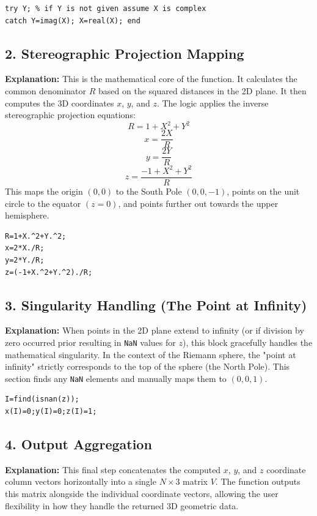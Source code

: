 \begin{lstlisting}[style=matlabstyle]
try Y; % if Y is not given assume X is complex
catch Y=imag(X); X=real(X); end
\end{lstlisting}

\subsection{2. Stereographic Projection Mapping}
\textbf{Explanation:} 
This is the mathematical core of the function. It calculates the common denominator $R$ based on the squared distances in the 2D plane. It then computes the 3D coordinates $x$, $y$, and $z$. The logic applies the inverse stereographic projection equations:
$$R=1+X^2+Y^2$$
$$x=\frac{2X}{R}$$
$$y=\frac{2Y}{R}$$
$$z=\frac{-1+X^2+Y^2}{R}$$
This maps the origin $(0,0)$ to the South Pole $(0,0,-1)$, points on the unit circle to the equator $(z=0)$, and points further out towards the upper hemisphere.

\begin{lstlisting}[style=matlabstyle]
R=1+X.^2+Y.^2;
x=2*X./R;
y=2*Y./R;
z=(-1+X.^2+Y.^2)./R;
\end{lstlisting}

\subsection{3. Singularity Handling (The Point at Infinity)}
\textbf{Explanation:} 
When points in the 2D plane extend to infinity (or if division by zero occurred prior resulting in \texttt{NaN} values for $z$), this block gracefully handles the mathematical singularity. In the context of the Riemann sphere, the "point at infinity" strictly corresponds to the top of the sphere (the North Pole). This section finds any \texttt{NaN} elements and manually maps them to $(0,0,1)$.

\begin{lstlisting}[style=matlabstyle]
I=find(isnan(z));
x(I)=0;y(I)=0;z(I)=1;
\end{lstlisting}

\subsection{4. Output Aggregation}
\textbf{Explanation:} 
This final step concatenates the computed $x$, $y$, and $z$ coordinate column vectors horizontally into a single $N \times 3$ matrix $V$. The function outputs this matrix alongside the individual coordinate vectors, allowing the user flexibility in how they handle the returned 3D geometric data.


